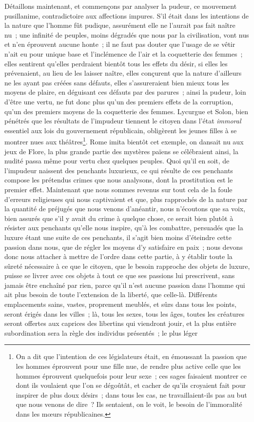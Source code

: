 \documentclass[french,twoside]{book} %
\begin{document}
Détaillons maintenant, et commençons par analyser la pudeur, ce mouvement pusillanime, contradictoire aux affections impures. S’il était dans les intentions de la nature que l’homme fût pudique, assurément elle ne l’aurait pas fait naître nu ; une infinité de peuples, moins dégradés que nous par la civilisation, vont nus et n’en éprouvent aucune honte ; il ne faut pas douter que l’usage de se vêtir n’ait eu pour unique base et l’inclémence de l’air et la coquetterie des femmes ; elles sentirent qu’elles perdraient bientôt tous les effets du désir, si elles les prévenaient, au lieu de les laisser naître, elles conçurent que la nature d’ailleurs ne les ayant pas créées sans défauts, elles s’assureraient bien mieux tous les moyens de plaire, en déguisant ces défauts par des parures ; ainsi la pudeur, loin d’être une vertu, ne fut donc plus qu’un des premiers effets de la corruption, qu’un des premiers moyens de la coquetterie des femmes. Lycurgue et Solon, bien pénétrés que les résultats de l’impudeur tiennent le citoyen dans l’état {\itshape immoral} essentiel aux lois du gouvernement républicain, obligèrent les jeunes filles à se montrer nues aux théâtres\footnote{ On a dit que l’intention de ces législateurs était, en émoussant la passion que les hommes éprouvent pour une fille nue, de rendre plus active celle que les hommes éprouvent quelquefois pour leur sexe ; ces sages faisaient montrer ce dont ils voulaient que l’on se dégoûtât, et cacher de qu’ils croyaient fait pour inspirer de plus doux désirs ; dans tous les cas, ne travaillaient-ils pas au but que nous venons de dire ? Ils sentaient, on le voit, le besoin de l’immoralité dans les mœurs républicaines.}. Rome imita bientôt cet exemple, on dansait nu aux jeux de Flore, la plus grande partie des mystères païens se célébraient ainsi, la nudité passa même pour vertu chez quelques peuples. Quoi qu’il en soit, de l’impudeur naissent des penchants luxurieux, ce qui résulte de ces penchants compose les prétendus crimes que nous analysons, dont la prostitution est le premier effet. Maintenant que nous sommes revenus sur tout cela de la foule d’erreurs religieuses qui nous captivaient et que, plus rapprochés de la nature par la quantité de préjugés que nous venons d’anéantir, nous n’écoutons que sa voix, bien assurés que s’il y avait du crime à quelque chose, ce serait bien plutôt à résister aux penchants qu’elle nous inspire, qu’à les combattre, persuadés que la luxure étant une suite de ces penchants, il s’agit bien moins d’éteindre cette passion dans nous, que de régler les moyens d’y satisfaire en paix ; nous devons donc nous attacher à mettre de l’ordre dans cette partie, à y établir toute la sûreté nécessaire à ce que le citoyen, que le besoin rapproche des objets de luxure, puisse se livrer avec ces objets à tout ce que ses passions lui prescrivent, sans jamais être enchaîné par rien, parce qu’il n’est aucune passion dans l’homme qui ait plus besoin de toute l’extension de la liberté, que celle-là. Différents emplacements sains, vastes, proprement meublés, et sûrs dans tous les points, seront érigés dans les villes ; là, tous les sexes, tous les âges, toutes les créatures seront offertes aux caprices des libertins qui viendront jouir, et la plus entière subordination sera la règle des individus présentés ; le plus léger 
\end{document}

